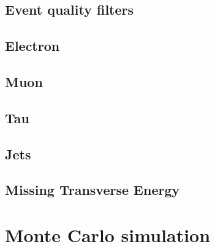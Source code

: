 \subsection{Event quality filters}




\subsection{Electron}

\subsection{Muon}

\subsection{Tau}

\subsection{Jets}

\subsection{Missing Transverse Energy}

\section{Monte Carlo simulation}



% 
% 
% 
% 
% 
